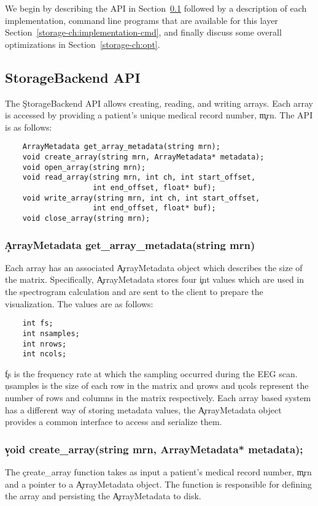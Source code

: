 We begin by describing the API in Section~\ref{storage-ch:api} followed by a
description of each implementation, command line programs that are available
for this layer Section~\ref{storage-ch:implementation-cmd}, and finally discuss
some overall optimizations in Section~\ref{storage-ch:opt}.

\subsection{StorageBackend API}\label{storage-ch:api}

The \c{StorageBackend} API allows creating, reading, and writing arrays. Each
array is accessed by providing a patient's unique medical record number,
\c{mrn}. The API is as follows:

\begin{lstlisting}
    ArrayMetadata get_array_metadata(string mrn);
    void create_array(string mrn, ArrayMetadata* metadata);
    void open_array(string mrn);
    void read_array(string mrn, int ch, int start_offset,
                    int end_offset, float* buf);
    void write_array(string mrn, int ch, int start_offset,
                    int end_offset, float* buf);
    void close_array(string mrn);
\end{lstlisting}

\subsubsection{\c{ArrayMetadata get\_array\_metadata(string mrn)}}
Each array has an associated \c{ArrayMetadata} object which describes the size
of the matrix. Specifically, \c{ArrayMetadata} stores four \c{int} values which
are used in the spectrogram calculation and are sent to the client to prepare
the visualization. The values are as follows:

\begin{lstlisting}
    int fs;
    int nsamples;
    int nrows;
    int ncols;
\end{lstlisting}

\c{fs} is the frequency rate at which the sampling occurred during the EEG
scan. \c{nsamples} is the size of each row in the matrix and \c{nrows} and
\c{ncols} represent the number of rows and columns in the matrix respectively.
Each array based system has a different way of storing metadata values, the
\c{ArrayMetadata} object provides a common interface to access and serialize them.

\subsubsection{\c{void create\_array(string mrn, ArrayMetadata* metadata);}}
The \c{create\_array} function takes as input a patient's medical record
number, \c{mrn} and a pointer to a \c{ArrayMetadata} object. The function is
responsible for defining the array and persisting the \c{ArrayMetadata} to
disk.

